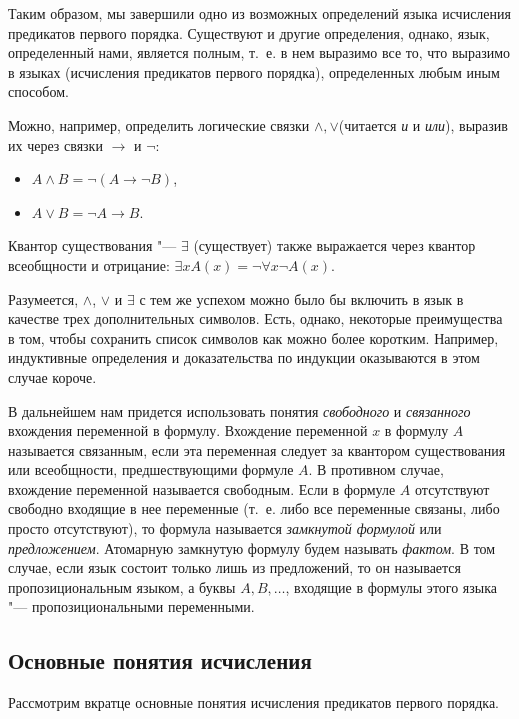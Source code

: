 \documentclass[b5paper,11pt]{book}
\numberwithin{Def}{section}
\numberwithin{Th}{chapter}
\numberwithin{St}{chapter}
\begin{document}
	Таким образом, мы завершили одно из возможных определений языка исчисления предикатов первого порядка. Существуют и другие определения, однако, язык, определенный нами, является полным, т.~е. в нем выразимо все то, что выразимо в языках (исчисления предикатов первого порядка), определенных любым иным способом.
	
	Можно, например, определить логические связки $\wedge, \vee$(читается \textit{и} и \textit{или}), выразив их через связки $\rightarrow$ и $\neg$:
	\begin{itemize}
		\item $A\wedge B = \neg(A\rightarrow\neg B)$,
		\item $A\vee B =\neg A\rightarrow B$.
	\end{itemize}
	
	Квантор существования "--- $\exists$ (существует) также выражается через квантор всеобщности и отрицание: $\exists x A(x) = \neg\forall x\neg A(x)$.
	
	Разумеется, $\wedge$, $\vee$ и $\exists$ с тем же успехом можно было бы включить в язык в качестве трех дополнительных символов. Есть, однако, некоторые преимущества в том, чтобы сохранить список символов как можно более коротким. Например, индуктивные определения и доказательства по индукции оказываются в этом случае короче.
	
	В дальнейшем нам придется использовать понятия \textit{свободного} и \textit{связанного} вхождения переменной в формулу. Вхождение переменной $x$ в формулу $A$ называется связанным, если эта переменная следует за квантором существования или всеобщности, предшествующими  формуле $A$. В противном случае, вхождение переменной называется свободным. Если в формуле $A$ отсутствуют свободно входящие в нее переменные (т.~е. либо все переменные связаны, либо просто отсутствуют), то формула называется \textit{замкнутой формулой} или \textit{предложением}. Атомарную замкнутую формулу будем называть \textit{фактом}. В том случае, если язык состоит только лишь из предложений, то он называется пропозициональным языком, а буквы $A,B,\dots$, входящие в формулы этого языка "--- пропозициональными переменными.
	
	\subsection{Основные понятия исчисления}\label{LangAx}
	Рассмотрим вкратце основные понятия исчисления предикатов первого порядка.
	
\end{document}
